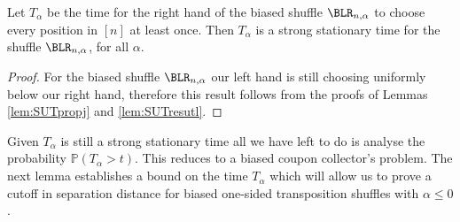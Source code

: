 \documentclass[11pt]{report}
\begin{document}
\begin{lemma}
	\label{lem:SSTtimebias}
	Let $T_{\alpha}$ be the time for the right hand of the biased shuffle 
	$\BLR_{n,\alpha}$ to choose every position in $[n]$ at least once. Then 
	$T_{\alpha}$ is a strong stationary time for the shuffle 
	$\BLR_{n,\alpha}$, for all $\alpha$.
\end{lemma}
\begin{proof}
	For the biased shuffle $\BLR_{n,\alpha}$ our left hand is still choosing uniformly below our right hand, therefore this result follows from the proofs of Lemmas \ref{lem:SUTpropj} and \ref{lem:SUTresutl}.
\end{proof}

Given $T_{\alpha}$ is still a strong stationary time all we have left to do is analyse the probability $\mathbb{P}(T_{\alpha}> t)$. This reduces to a biased coupon collector's problem. The next lemma establishes a bound on the time $T_{\alpha}$ which will allow us to prove a cutoff in separation distance for biased one-sided transposition shuffles with $\alpha\leq 0$.
\end{document}
